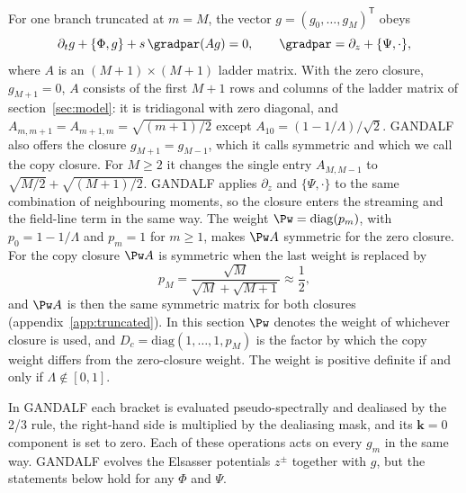 For one branch truncated at $m=M$, the vector $g=(g_0,\dots,g_M)^{\mathsf T}$ obeys
\begin{equation}\label{tr:hierarchy}
  \partial_tg+\{\Phi,g\}+s\,\gradpar(Ag)=0,\qquad \gradpar=\partial_z+\{\Psi,\cdot\},
\end{equation}
where $A$ is an $(M+1)\times(M+1)$ ladder matrix. With the zero closure, $g_{M+1}=0$, $A$ consists of the first $M+1$ rows and columns of the ladder matrix of section~\ref{sec:model}: it is tridiagonal with zero diagonal, and $A_{m,m+1}=A_{m+1,m}=\sqrt{(m+1)/2}$ except $A_{10}=(1-1/\Lambda)/\sqrt2$. GANDALF also offers the closure $g_{M+1}=g_{M-1}$, which it calls symmetric and which we call the copy closure. For $M\ge2$ it changes the single entry $A_{M,M-1}$ to $\sqrt{M/2}+\sqrt{(M+1)/2}$. GANDALF applies $\partial_z$ and $\{\Psi,\cdot\}$ to the same combination of neighbouring moments, so the closure enters the streaming and the field-line term in the same way. The weight $\Pw=\mathrm{diag}(p_m)$, with $p_0=1-1/\Lambda$ and $p_m=1$ for $m\ge1$, makes $\Pw A$ symmetric for the zero closure. For the copy closure $\Pw A$ is symmetric when the last weight is replaced by
\begin{equation}\label{tr:pM}
  p_M=\frac{\sqrt M}{\sqrt M+\sqrt{M+1}}\approx\frac12 ,
\end{equation}
and $\Pw A$ is then the same symmetric matrix for both closures (appendix~\ref{app:truncated}). In this section $\Pw$ denotes the weight of whichever closure is used, and $D_c=\mathrm{diag}(1,\dots,1,p_M)$ is the factor by which the copy weight differs from the zero-closure weight. The weight is positive definite if and only if $\Lambda\notin[0,1]$.

In GANDALF each bracket is evaluated pseudo-spectrally and dealiased by the 2/3 rule, the right-hand side is multiplied by the dealiasing mask, and its $\boldsymbol k=0$ component is set to zero. Each of these operations acts on every $g_m$ in the same way. GANDALF evolves the Elsasser potentials $z^\pm$ together with $g$, but the statements below hold for any $\Phi$ and $\Psi$.

